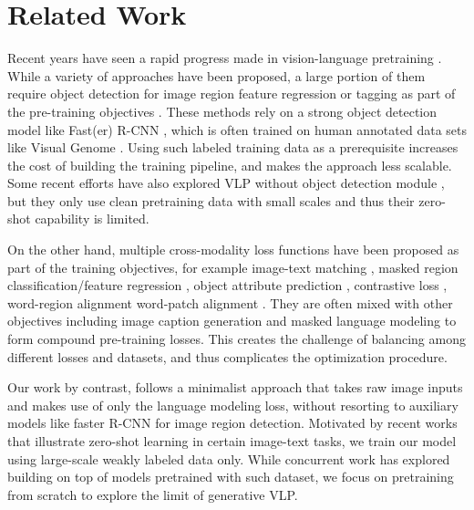 \documentclass{article} \usepackage{iclr2022_conference,times}
\begin{document}
\section{Related Work}

Recent years have seen a rapid progress made in vision-language pretraining \citep{uppal2020multimodal,han2021survey,khan2021transformers}. 
While a variety of approaches have been proposed, 
a large portion of them require object detection for image region feature regression or tagging as part of the pre-training objectives \citep{tan-bansal-2019-lxmert,Su2020VL-BERT,li2019visualbert,chen2020uniter,gan2020large,li2020oscar,yu2021ernie,li-etal-2021-unimo,Zhang_2021_CVPR,hu2021vivo,cho2021unifying}.
These methods rely on a strong object detection model like Fast(er) R-CNN \citep{NIPS2015_14bfa6bb}, 
which is often trained on human annotated data sets like Visual Genome \citep{krishnavisualgenome}. 
Using such labeled training data as a prerequisite increases the cost of building the training pipeline, and makes the approach less scalable.
Some recent efforts have also explored VLP without object detection module \citep{xu-etal-2021-e2e, kim2021vilt, huang2021seeing},
but they only use clean pretraining data with small scales and thus their zero-shot capability is limited.



On the other hand,
multiple cross-modality loss functions have been proposed as part of the training objectives, for example
image-text matching \citep{tan-bansal-2019-lxmert,jiasen2019vilbert,xu-etal-2021-e2e},
masked region classification/feature regression \citep{tan-bansal-2019-lxmert,chen2020uniter},
object attribute prediction \citep{xu-etal-2021-e2e}, 
contrastive loss \citep{li2020oscar,li-etal-2021-unimo},
word-region alignment \citep{chen2020uniter}
word-patch alignment \citep{kim2021vilt}.
They are often mixed with other objectives including image caption generation and masked language modeling to form compound pre-training losses.
This creates the challenge of balancing among different losses and datasets,
and thus complicates the optimization procedure.

Our work by contrast, 
follows a minimalist approach that takes raw image inputs and makes use of only the language modeling loss,
without resorting to auxiliary models like faster R-CNN for image region detection.
Motivated by recent works \citep{radford2021learning,ramesh2021zero,jia2021scaling,tsimpoukelli2021multimodal} that illustrate zero-shot learning in certain image-text tasks,
we train our model using large-scale weakly labeled data only.
While concurrent work \citep{shen2021much} has explored building on top of models pretrained with such dataset,
we focus on pretraining from scratch to explore the limit of generative VLP.
\end{document}
